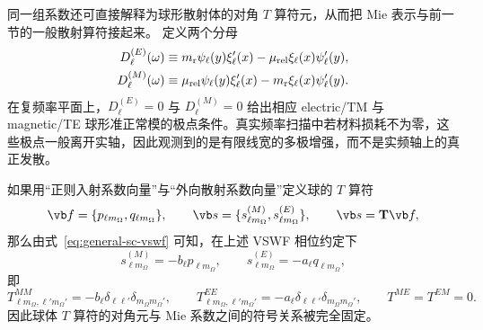同一组系数还可直接解释为球形散射体的对角 $T$ 算符元，从而把 Mie 表示与前一节的一般散射算符接起来。
定义两个分母
\begin{align}
D_\ell^{(E)}(\omega)
&\equiv
m_{\rm r}\psi_\ell(y)\xi_\ell'(x)
-\mu_{\rm rel}\xi_\ell(x)\psi_\ell'(y),
\\
D_\ell^{(M)}(\omega)
&\equiv
\mu_{\rm rel}\psi_\ell(y)\xi_\ell'(x)
-m_{\rm r}\xi_\ell(x)\psi_\ell'(y).
\label{eq:mie-resonance-denominators}
\end{align}
在复频率平面上，$D_\ell^{(E)}=0$ 与
$D_\ell^{(M)}=0$ 给出相应 electric/TM 与 magnetic/TE 球形准正常模的极点条件。真实频率扫描中若材料损耗不为零，这些极点一般离开实轴，因此观测到的是有限线宽的多极增强，而不是实频轴上的真正发散。

如果用“正则入射系数向量”与“外向散射系数向量”定义球的 $T$ 算符
\begin{equation}
\vb f
=\{p_{\ell m_{\Omega}},q_{\ell m_{\Omega}}\},
\qquad
\vb s
=\{s_{\ell m_{\Omega}}^{(M)},s_{\ell m_{\Omega}}^{(E)}\},
\qquad
\vb s=\mathbf T\vb f,
\end{equation}
那么由式~\cref{eq:general-sc-vswf} 可知，在上述 VSWF 相位约定下
\begin{equation}
{
s_{\ell m_{\Omega}}^{(M)}=-b_\ell p_{\ell m_{\Omega}},
\qquad
s_{\ell m_{\Omega}}^{(E)}=-a_\ell q_{\ell m_{\Omega}},}
\label{eq:mie-T-diagonal}
\end{equation}
即
\begin{equation}
T_{\ell m_{\Omega},\ell' m_{\Omega}'}^{MM}
=-b_\ell\delta_{\ell\ell'}\delta_{m_{\Omega}m_{\Omega}'},
\qquad
T_{\ell m_{\Omega},\ell' m_{\Omega}'}^{EE}
=-a_\ell\delta_{\ell\ell'}\delta_{m_{\Omega}m_{\Omega}'},
\qquad
T^{ME}=T^{EM}=0.
\end{equation}
因此球体 $T$ 算符的对角元与 Mie 系数之间的符号关系被完全固定。


